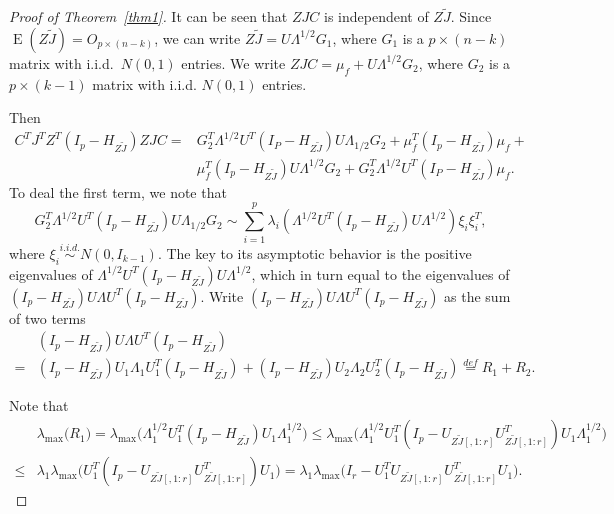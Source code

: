 \documentclass[review]{elsarticle}
\DeclareMathOperator{\myE}{E}
\theoremstyle{plain}
\theoremstyle{definition}
\theoremstyle{remark}
\begin{document}
\begin{proof}[\textrm{Proof of Theorem~\ref{thm1}}]
It can be seen that $ZJC$ is independent of ${Z\tilde{J}}$.
Since
$
\myE (Z\tilde{J}) = O_{p\times (n-k)}
$,
we can write
$
Z\tilde{J} = U\Lambda^{1/2} G_1
$,
where $G_1$ is a $p\times (n-k)$ matrix with i.i.d.\ $N(0,1)$ entries.
We write
$
ZJC = \mu_f + U\Lambda^{1/2} G_2
$, 
where $G_2$ is a $p\times (k-1)$ matrix with i.i.d. $N(0,1)$ entries.

Then 
\begin{equation}\label{eq:maindec}
\begin{aligned}
C^TJ^T Z^T(I_p-H_{Z\tilde J}) ZJC
=&
G_2^T \Lambda^{1/2}U^T (I_P-H_{Z\tilde{J}})U\Lambda_{1/2}G_2+
\mu_f^T (I_p -H_{Z\tilde{J}})\mu_f+\\
&\mu_f^T (I_p -H_{Z\tilde{J}})U\Lambda^{1/2}G_2+
G_2^T \Lambda^{1/2}U^T (I_P-H_{Z\tilde{J}})\mu_f.
\end{aligned}
\end{equation}
To deal the first term, we note that
$$
G_2^T \Lambda^{1/2}U^T (I_p-H_{Z\tilde{J}})U\Lambda_{1/2}G_2\sim
\sum_{i=1}^p \lambda_i (\Lambda^{1/2}U^T (I_p-H_{Z\tilde{J}})U\Lambda^{1/2})\xi_i \xi_i^T,
$$
where $\xi_i\overset{i.i.d.}{\sim} N(0,I_{k-1})$. The key to its asymptotic behavior is the positive eigenvalues of $\Lambda^{1/2}U^T (I_p-H_{Z\tilde{J}})U\Lambda^{1/2}$, which in turn equal to the eigenvalues of $(I_p-H_{Z\tilde{J}})U\Lambda U^T (I_p-H_{Z\tilde{J}})$.
Write $(I_p-H_{Z\tilde{J}})U\Lambda U^T (I_p-H_{Z\tilde{J}})$ as the sum of two terms
$$
\begin{aligned}
&(I_p-H_{Z\tilde{J}})U\Lambda U^T (I_p-H_{Z\tilde{J}})
\\
=&
(I_p-H_{Z\tilde{J}})U_1\Lambda_1 U_1^T(I_p-H_{Z\tilde{J}})+(I_p-H_{Z\tilde{J}})U_2\Lambda_2 U_2^T (I_p-H_{Z\tilde{J}})
\overset{def}{=}R_1+R_2.
\end{aligned}
$$

Note that
$$
\begin{aligned}
&\lambda_{\max}\big( R_1 \big)
=
\lambda_{\max}\big(\Lambda_1^{1/2} U_1^T(I_p-H_{Z\tilde{J}}) U_1 \Lambda_1^{1/2}\big)
\leq 
\lambda_{\max}\big(\Lambda_1^{1/2} U_1^T(I_p-U_{Z\tilde{J}[,1:r]}U_{Z\tilde{J}[,1:r]}^T) U_1 \Lambda_1^{1/2}\big)\\
\leq &
\lambda_1
\lambda_{\max}\big(U_1^T(I_p-U_{Z\tilde{J}[,1:r]}U_{Z\tilde{J}[,1:r]}^T) U_1 \big)
= 
\lambda_1
\lambda_{\max}\big(I_r - U_1^TU_{Z\tilde{J}[,1:r]}U_{Z\tilde{J}[,1:r]}^T U_1 \big).
\end{aligned}
$$


\end{proof}
\end{document}
